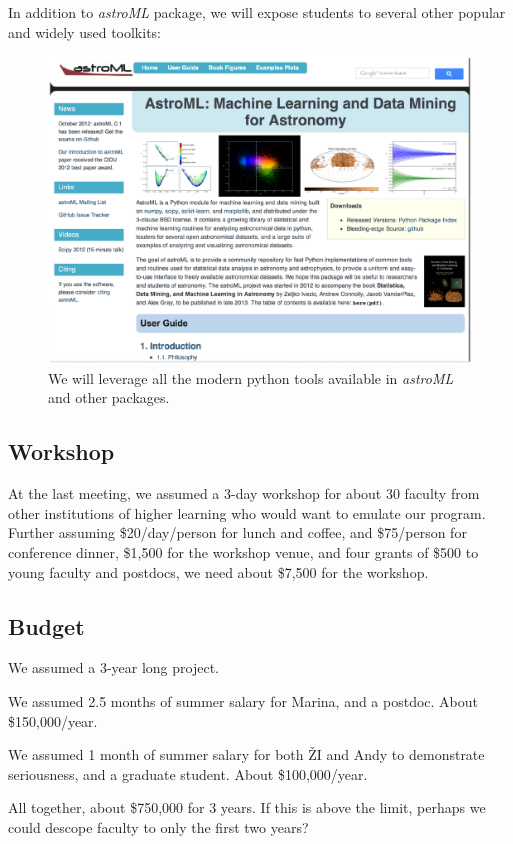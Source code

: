 In addition to  {\it astroML} package, we will expose students to several other popular and widely
used toolkits: 









\begin{figure}[!t]
\vskip -5.5in
\includegraphics[width=1.02\hsize,clip]{astroML.eps}
\vskip -2.0in
\caption{We will leverage all the modern python tools available in {\it astroML} and
other packages.} 
\label{Fig:astroML}
\end{figure}




\subsection{Workshop} 


At the last meeting, we assumed a 3-day workshop for about 30 faculty from other institutions
of higher learning who would want to emulate our program. Further assuming \$20/day/person
for lunch and coffee, and \$75/person for conference dinner, \$1,500 for the workshop venue,
and four grants of \$500 to young faculty and postdocs, we need about \$7,500 for the workshop. 



\subsection{Budget} 

We assumed a 3-year long project. 

We assumed 2.5 months of summer salary for Marina, and a postdoc. About \$150,000/year. 

We assumed 1 month of summer salary for both \v{Z}I and Andy to demonstrate seriousness,
and a graduate student. About \$100,000/year. 

All together, about \$750,000 for 3 years. If this is above the limit, perhaps we could 
descope faculty to only the first two years? 



